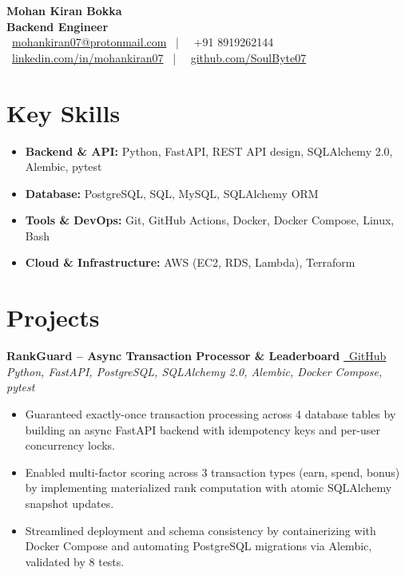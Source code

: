 \documentclass[10pt, letterpaper]{article}
\begin{document}
\pagestyle{empty}

\begin{center}
    {\LARGE \textbf{Mohan Kiran Bokka}} \\
    \vspace{2pt}
    {\large \textbf{Backend Engineer}} \\
    \faEnvelope\ \href{mailto:mohankiran07@protonmail.com}{mohankiran07@protonmail.com} \ | \ \faPhone\ +91 8919262144 \\
    \faLinkedin\ \href{https://linkedin.com/in/mohankiran07}{linkedin.com/in/mohankiran07} \ | \ \faGithub\ \href{https://github.com/SoulByte07}{github.com/SoulByte07}
\end{center}

\section{Key Skills}
\begin{itemize}
    \item \textbf{Backend \& API:} Python, FastAPI, REST API design, SQLAlchemy 2.0, Alembic, pytest
    \item \textbf{Database:} PostgreSQL, SQL, MySQL, SQLAlchemy ORM
    \item \textbf{Tools \& DevOps:} Git, GitHub Actions, Docker, Docker Compose, Linux, Bash
    \item \textbf{Cloud \& Infrastructure:} AWS (EC2, RDS, Lambda), Terraform
\end{itemize}

\section{Projects}


\noindent \textbf{RankGuard – Async Transaction Processor \& Leaderboard} \href{https://github.com/SoulByte07/RankGuard}{\faGithub\ GitHub} \\
\textit{Python, FastAPI, PostgreSQL, SQLAlchemy 2.0, Alembic, Docker Compose, pytest}
\begin{itemize}
    \item Guaranteed exactly-once transaction processing across 4 database tables by building an async FastAPI backend with idempotency keys and per-user concurrency locks.
    \item Enabled multi-factor scoring across 3 transaction types (earn, spend, bonus) by implementing materialized rank computation with atomic SQLAlchemy snapshot updates.
    \item Streamlined deployment and schema consistency by containerizing with Docker Compose and automating PostgreSQL migrations via Alembic, validated by 8 tests.
\end{itemize}
\end{document}
